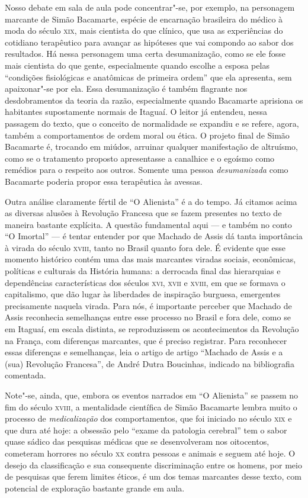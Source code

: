 Nosso debate em sala de aula pode concentrar"-se, por exemplo, na
personagem marcante de Simão Bacamarte, espécie de encarnação brasileira
do médico à moda do século \textsc{xix}, mais cientista do que clínico, que usa
as experiências do cotidiano terapêutico para avançar as hipóteses que
vai compondo ao sabor dos resultados. Há nessa personagem uma certa
desumanização, como se ele fosse mais cientista do que gente,
especialmente quando escolhe a esposa pelas ``condições fisiológicas e
anatômicas de primeira ordem'' que ela apresenta, sem apaixonar"-se por
ela. Essa desumanização é também flagrante nos desdobramentos da teoria
da razão, especialmente quando Bacamarte aprisiona os habitantes
supostamente normais de Itaguaí. O leitor já entendeu, nessa passagem do
texto, que o conceito de normalidade se expandiu e se refere, agora,
também a comportamentos de ordem moral ou ética. O projeto final de
Simão Bacamarte é, trocando em miúdos, arruinar qualquer manifestação de
altruísmo, como se o tratamento proposto apresentasse a canalhice e o
egoísmo como remédios para o respeito aos outros. Somente uma pessoa
\emph{desumanizada} como Bacamarte poderia propor essa terapêutica às
avessas.

Outra análise claramente fértil de ``O Alienista'' é a do tempo. Já
citamos acima as diversas alusões à Revolução Francesa que se fazem
presentes no texto de maneira bastante explícita. A questão fundamental
aqui --- e também no conto ``O Imortal'' --- é tentar entender por que
Machado de Assis dá tanta importância à virada do século \textsc{xviii}, tanto no
Brasil quanto fora dele. É evidente que esse momento histórico contém
uma das mais marcantes viradas sociais, econômicas, políticas e
culturais da História humana: a derrocada final das hierarquias e
dependências características dos séculos \textsc{xvi}, \textsc{xvii} e \textsc{xviii}, em que se
formava o capitalismo, que dão lugar às liberdades de inspiração
burguesa, emergentes precisamente naquela virada. Para nós, é importante
perceber que Machado de Assis reconhecia semelhanças entre esse processo
no Brasil e fora dele, como se em Itaguaí, em escala distinta, se
reproduzissem os acontecimentos da Revolução na França, com diferenças
marcantes, que é preciso registrar. Para reconhecer essas diferenças e
semelhanças, leia o artigo de artigo ``Machado de Assis e a (sua)
Revolução Francesa'', de André Dutra Boucinhas, indicado na bibliografia
comentada.

Note"-se, ainda, que, embora os eventos narrados em ``O Alienista'' se
passem no fim do século \textsc{xviii}, a mentalidade científica de Simão
Bacamarte lembra muito o processo de \emph{medicalização} dos
comportamentos, que foi iniciado no século \textsc{xix} e que dura até hoje: a
obsessão pelo ``exame da patologia cerebral'' tem o sabor quase sádico
das pesquisas médicas que se desenvolveram nos oitocentos, cometeram
horrores no século \textsc{xx} contra pessoas e animais e seguem até hoje. O
desejo da classificação e sua consequente discriminação entre os homens,
por meio de pesquisas que ferem limites éticos, é um dos temas marcantes
desse texto, com potencial de exploração bastante grande em aula.

